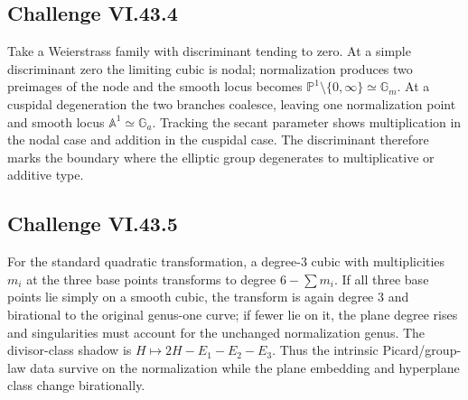 \subsection*{Challenge VI.43.4}
\begin{solution}
Take a Weierstrass family with discriminant tending to zero.  At a simple discriminant zero the limiting cubic is nodal; normalization produces two preimages of the node and the smooth locus becomes \(\mathbb P^1\setminus\{0,\infty\}\simeq\mathbb G_m\).  At a cuspidal degeneration the two branches coalesce, leaving one normalization point and smooth locus \(\mathbb A^1\simeq\mathbb G_a\).  Tracking the secant parameter shows multiplication in the nodal case and addition in the cuspidal case.  The discriminant therefore marks the boundary where the elliptic group degenerates to multiplicative or additive type.
\end{solution}

\subsection*{Challenge VI.43.5}
\begin{solution}
For the standard quadratic transformation, a degree-\(3\) cubic with multiplicities \(m_i\) at the three base points transforms to degree \(6-\sum m_i\).  If all three base points lie simply on a smooth cubic, the transform is again degree \(3\) and birational to the original genus-one curve; if fewer lie on it, the plane degree rises and singularities must account for the unchanged normalization genus.  The divisor-class shadow is \(H\mapsto2H-E_1-E_2-E_3\).  Thus the intrinsic Picard/group-law data survive on the normalization while the plane embedding and hyperplane class change birationally.
\end{solution}

